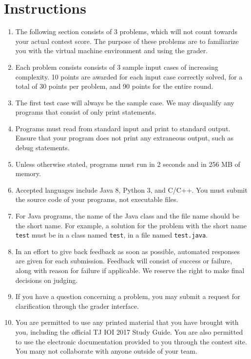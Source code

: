 \section*{Instructions}

\blank

\large
\begin{enumerate}
    \item The following section consists of 3 problems, which will not count towards your actual contest score.  The purpose of these problems are to familiarize you with the virtual machine environment and using the grader.
    \item Each problem consists consists of 3 sample input cases of increasing complexity. 10 points are awarded for each input case correctly solved, for a total of 30 points per problem, and 90 points for the entire round.
    \item The first test case will always be the sample case. We may disqualify any programs that consist of only print statements.
    \item Programs must read from standard input and print to standard output. Ensure that your program does not print any extraneous output, such as debug statements.
    \item Unless otherwise stated, programs must run in 2 seconds and in 256 MB of memory.
    \item Accepted languages include Java 8, Python 3, and C/C++. You must submit the source code of your programs, not executable files.
    \item For Java programs, the name of the Java class and the file name should be the short name. For example, a solution for the problem with the short name \verb|test| must be in a class named \verb|test|, in a file named \verb|test.java|.
    \item In an effort to give back feedback as soon as possible, automated responses are given for each submission. Feedback will consist of success or failure, along with reason for failure if applicable. We reserve the right to make final decisions on judging.
    \item If you have a question concerning a problem, you may submit a request for clarification through the grader interface.
    \item You are permitted to use any printed material that you have brought with you, including the official TJ IOI 2017 Study Guide.  You are also permitted to use the electronic documentation provided to you through the contest site. You many not collaborate with anyone outside of your team.

\end{enumerate}
